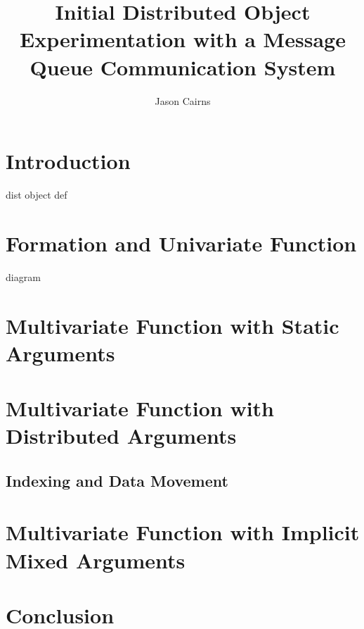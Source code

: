 \documentclass[a4paper,10pt]{article}
\begin{document}
\title{Initial Distributed Object Experimentation with a Message Queue Communication System}
\author{Jason Cairns}
  
\maketitle{}

\section{Introduction}

dist object def

\section{Formation and Univariate Function}

diagram

\section{Multivariate Function with Static Arguments}

\section{Multivariate Function with Distributed Arguments}

\subsection{Indexing and Data Movement}

\section{Multivariate Function with Implicit Mixed Arguments}

\section{Conclusion}
\end{document}
